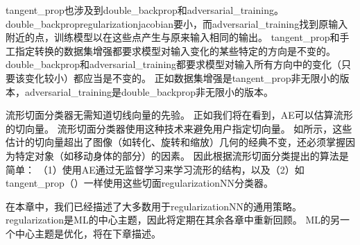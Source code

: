 
\gls{tangent_prop}也涉及到\gls{double_backprop}\citep{DruckerLeCun92}和\gls{adversarial_training}\citep{Szegedy-et-al-arxiv2014,Goodfellow-2015-adversarial}。
\gls{double_backprop}\gls{regularization}\gls{jacobian}要小，而\gls{adversarial_training}找到原输入附近的点，训练模型以在这些点产生与原来输入相同的输出。
\gls{tangent_prop}和手工指定转换的数据集增强都要求模型对输入变化的某些特定的方向是不变的。
\gls{double_backprop}和\gls{adversarial_training}都要求模型对输入所有方向中的变化（只要该变化较小）都应当是不变的。
正如数据集增强是\gls{tangent_prop}非无限小的版本，\gls{adversarial_training}是\gls{double_backprop}非无限小的版本。

流形切面分类器\citep{Dauphin-et-al-NIPS2011}无需知道切线向量的先验。
正如我们将在看到，\gls{AE}可以估算流形的切向量。
流形切面分类器使用这种技术来避免用户指定切向量。
如所示，这些估计的切向量超出了图像（如转化、旋转和缩放）几何的经典不变，还必须掌握因为特定对象（如移动身体的部分）的因素。
因此根据流形切面分类提出的算法是简单：
（1）使用\gls{AE}通过无监督学习来学习流形的结构，以及（2）如\gls{tangent_prop}（）一样使用这些切面\gls{regularization}\gls{NN}分类器。

在本章中，我们已经描述了大多数用于\gls{regularization}\gls{NN}的通用策略。
\gls{regularization}是\gls{ML}的中心主题，因此将定期在其余各章中重新回顾。
\gls{ML}的另一个中心主题是优化，将在下章描述。

